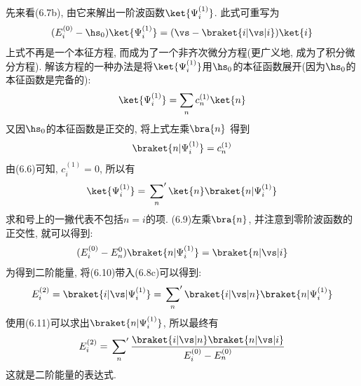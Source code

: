 先来看(6.7b), 
由它来解出一阶波函数$\ket{\Psi_i^{(1)}}$. 
此式可重写为
\begin{align}
(E_i^{(0)} - \hs_0 )\ket{\Psi_i^{(1)}} = (\vs - \braket{i|\vs|i})\ket{i}
\end{align}
上式不再是一个本征方程, 
而成为了一个非齐次微分方程(更广义地, 
成为了积分微分方程). 
解该方程的一种办法是将$\ket{\Psi_i^{(1)}}$用$\hs_0$的本征函数展开(因为$\hs_0$的本征函数是完备的):
\begin{align*}
\ket{\Psi_i^{(1)}} = \sum_n c_n^{(1)}\ket{n}
\end{align*}
又因$\hs_0$的本征函数是正交的, 
将上式左乘$\bra{n}$ 得到
\begin{align*}
\braket{n|\Psi_i^{(1)}} = c_n^{(1)}
\end{align*}
由(6.6)可知, 
$c_i^{(1)}=0$, 
所以有
\begin{align}
\ket{\Psi_i^{(1)}} = \sideset{}{'}\sum_n\ket{n}\braket{n|\Psi_i^{(1)}}
\end{align}
求和号上的一撇代表不包括$n=i$的项. 
(6.9)左乘$\bra{n}$, 
并注意到零阶波函数的正交性, 
就可以得到:
\begin{align}
(E_i^{(0)} - E_n^{0} )\braket{n|\Psi_i^{(1)}} = \braket{n|\vs|i}
\end{align}
为得到二阶能量, 
将(6.10)带入(6.8c)可以得到:
\begin{align*}
E_i^{(2)} = \braket{i|\vs|\Psi_i^{(1)}} = \sideset{}{'}\sum_n\braket{i|\vs|n}\braket{n|\Psi_i^{(1)}}
\end{align*}
使用(6.11)可以求出$\braket{n|\Psi_i^{(1)}}$, 
所以最终有
\begin{align}
E_i^{(2)} = \sideset{}{'}\sum_n\frac{\braket{i|\vs|n}\braket{n|\vs|i}}{E_i^{(0)} - E_n^{(0)}}
\end{align}
这就是二阶能量的表达式.


